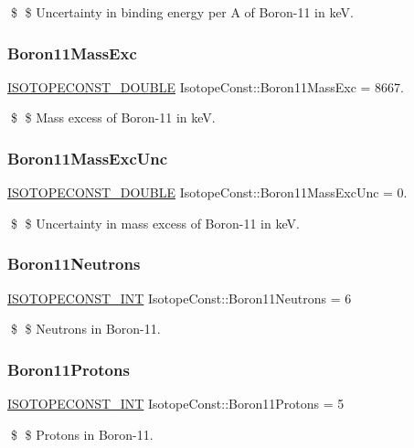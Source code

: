 \$ \$ Uncertainty in binding energy per A of Boron-\/11 in keV. \mbox{\label{group___isotope_const-_boron-_b11_ga931bd8d9c104966265dcaa1c7f2bc16a}} 
\subsubsection{\texorpdfstring{Boron11\+Mass\+Exc}{Boron11MassExc}}
{\footnotesize\ttfamily \mbox{\hyperlink{group___isotope_const-_macros_ga8f45a7272ce02c0b4c65c44636ed719a}{I\+S\+O\+T\+O\+P\+E\+C\+O\+N\+S\+T\+\_\+\+D\+O\+U\+B\+LE}} Isotope\+Const\+::\+Boron11\+Mass\+Exc = 8667.}

\$ \$ Mass excess of Boron-\/11 in keV. \mbox{\label{group___isotope_const-_boron-_b11_ga9dfb1f29fafba2ed3d49ea85f32ae768}} 
\subsubsection{\texorpdfstring{Boron11\+Mass\+Exc\+Unc}{Boron11MassExcUnc}}
{\footnotesize\ttfamily \mbox{\hyperlink{group___isotope_const-_macros_ga8f45a7272ce02c0b4c65c44636ed719a}{I\+S\+O\+T\+O\+P\+E\+C\+O\+N\+S\+T\+\_\+\+D\+O\+U\+B\+LE}} Isotope\+Const\+::\+Boron11\+Mass\+Exc\+Unc = 0.}

\$ \$ Uncertainty in mass excess of Boron-\/11 in keV. \mbox{\label{group___isotope_const-_boron-_b11_gab7a5fafe248988003b0b58f44d7e09d2}} 
\subsubsection{\texorpdfstring{Boron11\+Neutrons}{Boron11Neutrons}}
{\footnotesize\ttfamily \mbox{\hyperlink{group___isotope_const-_macros_ga5f18360b3e99483a35c32d789e62621c}{I\+S\+O\+T\+O\+P\+E\+C\+O\+N\+S\+T\+\_\+\+I\+NT}} Isotope\+Const\+::\+Boron11\+Neutrons = 6}

\$ \$ Neutrons in Boron-\/11. \mbox{\label{group___isotope_const-_boron-_b11_ga6b659d4aa47824b2a74efb81d9348608}} 
\subsubsection{\texorpdfstring{Boron11\+Protons}{Boron11Protons}}
{\footnotesize\ttfamily \mbox{\hyperlink{group___isotope_const-_macros_ga5f18360b3e99483a35c32d789e62621c}{I\+S\+O\+T\+O\+P\+E\+C\+O\+N\+S\+T\+\_\+\+I\+NT}} Isotope\+Const\+::\+Boron11\+Protons = 5}

\$ \$ Protons in Boron-\/11. 